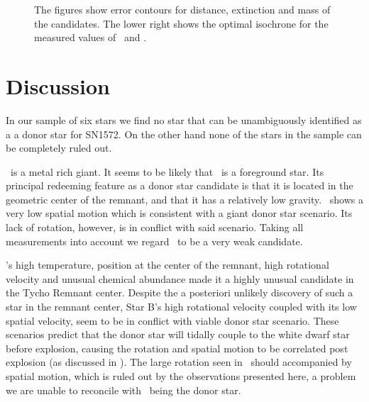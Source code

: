 \begin{figure}[htbp]
   \caption{The figures show error contours for distance, extinction and mass of the candidates. The lower right shows the optimal isochrone \citep{2004ApJ...612..168P}  for the measured values of \teff\ and \logg. }
   \label{fig:mc_isochrone}
\end{figure}



\section{Discussion}
\label{sec:discussion}

In our sample of six stars we find no star that can be unambiguously identified as a a donor star for SN1572. On the other hand none of the stars in the sample can be completely ruled out. 

\stara\ is a metal rich giant. It seems to be likely that \stara\ is a foreground star. Its principal redeeming feature as a donor star candidate is that it is located in the geometric center of the remnant, and that it has a relatively low gravity. \stara\ shows a very low spatial motion which is consistent with a giant donor star scenario. Its lack of rotation, however, is in conflict with said scenario. 
Taking all measurements into account we regard \stara\ to be a very weak candidate.

\starb's  high temperature, position at the center of the remnant, high rotational velocity and unusual chemical abundance made it a highly unusual candidate in the Tycho Remnant center. Despite the a posteriori unlikely discovery of such a star in the remnant center, Star B's high rotational velocity coupled with its low spatial velocity, seem to be in conflict with viable donor star scenario. 
These scenarios predict that the donor star will tidally couple to the white dwarf star before explosion, causing the rotation and spatial motion to be correlated post explosion (as discussed in \wek). The large rotation seen in \starb\ should accompanied by spatial motion, which is ruled out by the observations presented here, a problem we are unable to reconcile with \starb\ being the donor star. 

